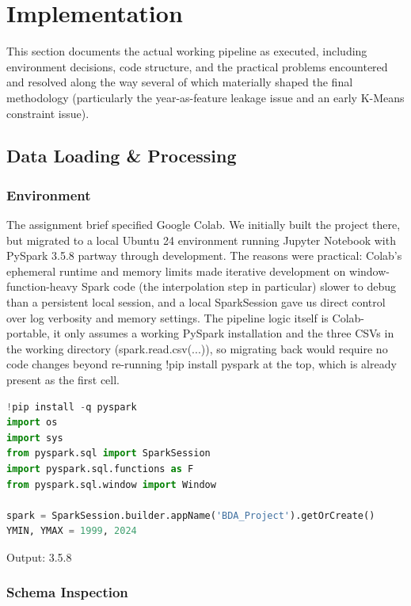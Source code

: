\documentclass[12pt,a4paper]{article}
\begin{document}
\clearpage
\section{Implementation}

This section documents the actual working pipeline as executed, including environment decisions, code structure, and the practical problems encountered and resolved along the way several of which materially shaped the final methodology (particularly the year-as-feature leakage issue and an early K-Means constraint issue).


\subsection{Data Loading \& Processing}
\subsubsection{Environment}

The assignment brief specified Google Colab. We initially built the project there, but migrated to a local Ubuntu 24 environment running Jupyter Notebook with PySpark 3.5.8 partway through development. The reasons were practical: Colab's ephemeral runtime and memory limits made iterative development on window-function-heavy Spark code (the interpolation step in particular) slower to debug than a persistent local session, and a local SparkSession gave us direct control over log verbosity and memory settings. The pipeline logic itself is Colab-portable, it only assumes a working PySpark installation and the three CSVs in the working directory (spark.read.csv(...)), so migrating back would require no code changes beyond re-running !pip install pyspark at the top, which is already present as the first cell.

\begin{lstlisting}[language=Python]
!pip install -q pyspark
import os
import sys
from pyspark.sql import SparkSession
import pyspark.sql.functions as F
from pyspark.sql.window import Window

spark = SparkSession.builder.appName('BDA_Project').getOrCreate()
YMIN, YMAX = 1999, 2024
\end{lstlisting}

Output: 3.5.8


\subsubsection{Schema Inspection}
\end{document}
